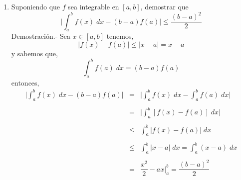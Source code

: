 \begin{enumerate}[\bfseries 1.]
\begin{enumerate}[\bfseries a)]
	    \item Suponiendo que $f$ sea integrable en $[a,b]$, demostrar que
		$$\bigg|\int_a^b f(x)\; dx - (b-a)f(a)\bigg|\leq \dfrac{(b-a)^2}{2}$$
		Demostración.-\; Sea $x\in [a,b]$ tenemos,
		$$|f(x)-f(a)|\leq |x-a|=x-a$$
		y sabemos que,
		$$\int_a^b f(a)\; dx = (b-a)f(a)$$
		entonces,
		$$\begin{array}{rcl}
		    \bigg|\displaystyle\int_a^b f(x)\; dx - (b-a)f(a)\bigg|&=&\bigg|\displaystyle\int_a^b f(x)\; dx - \displaystyle\int_a^b f(a)\; dx\bigg|\\\\
									   &=&\bigg|\displaystyle\int_a^b \left[f(x)-f(a)\right]\; dx\bigg|\\\\
					 &\leq &\displaystyle\int_a^b|f(x)-f(a)|\; dx\\\\
					 &\leq &\displaystyle\int_a^b |x-a|\; dx = \int_a^b (x-a)\;dx\\\\
					 &=&\dfrac{x^2}{2}-ax\bigg|_a^b = \dfrac{(b-a)^2}{2}\\\\
		\end{array}$$
		\vspace{.5cm}


\end{enumerate}
\end{enumerate}
